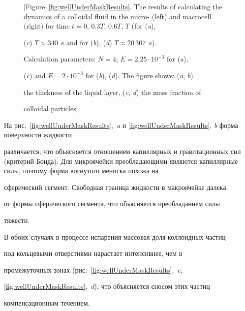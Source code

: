 \begin{figure}[b!]
[Figure~\ref{fig:wellUnderMaskResults}. The results of calculating the dynamics of a colloidal fluid in the micro- (left) and   macrocell (right) for time $t =0 $, $0.3T$, $0.6T$, $T$ (for ({\sl a}\/),

({\sl c}\/) ${T \approx 340}$~s and for ({\sl b}\/), ({\sl d}\/) ${T \approx 20\,307}$~s).

Calculation parameters: $N = 4$; $E = 2.25 \cdot 10^{-3}$ for ({\sl a}\/),

({\sl c}\/) and $E = 2 \cdot 10^{-3}$ for ({\sl b}\/), ({\sl d}\/). The figure shows: ({\sl a}\/, {\sl b}\/)

the thickness of the liquid layer, ({\sl c}\/, {\sl d}\/) the mass fraction of \centerline{colloidal particles]  }

  

\end{figure}



На рис.~\ref{fig:wellUnderMaskResults},~{\sl a} и \ref{fig:wellUnderMaskResults}, {\sl b} форма поверхности жидкости

различается, что объясняется отношением капиллярных и гравитационных сил (критерий Бонда). Для микроячейки преобладающими являются капиллярные силы, поэтому форма вогнутого мениска похожа на

сферический сегмент. Свободная граница жидкости в макроячейке далека

от формы сферического сегмента, что объясняется преобладанием силы

тяжести.



В обоих случаях в процессе испарения массовая доля коллоидных частиц

под кольцевыми отверстиями нарастает интенсивнее, чем в

промежуточных зонах (рис.~\ref{fig:wellUnderMaskResults},~{\sl c},

\ref{fig:wellUnderMaskResults},~{\sl d}), что объясняется сносом этих частиц

компенсационным течением.



\smallskip



\hypertarget{kol:5}{}






